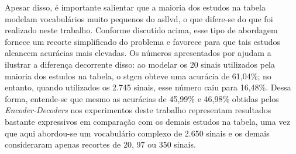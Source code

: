 Apesar disso, é importante salientar que a maioria dos estudos na tabela modelam vocabulários muito pequenos do \acrshort{asllvd}, o que difere-se do que foi realizado neste trabalho. Conforme discutido acima, esse tipo de abordagem fornece um recorte simplificado do problema e favorece para que tais estudos alcancem acurácias mais elevadas.
Os números apresentados por  ajudam a ilustrar a diferença decorrente disso: ao modelar os 20 sinais utilizados pela maioria dos estudos na tabela, o \acrshort{stgcn} obteve uma acurácia de 61,04\%; no entanto, quando utilizados os 2.745 sinais, esse número caiu para 16,48\%.
Dessa forma, entende-se que mesmo as acurácias de 45,99\% e 46,98\% obtidas pelos \textit{Encoder-Decoders} nos experimentos deste trabalho representam resultados bastante expressivos em comparação com os demais estudos na tabela, uma vez que aqui abordou-se um vocabulário complexo de 2.650 sinais e os demais consideraram apenas recortes de 20, 97 ou 350 sinais.










